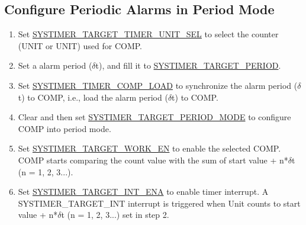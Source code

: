\documentclass[main\_\_EN.tex]{subfiles}
\begin{document}
\subsection{Configure Periodic Alarms in Period Mode}
\begin{enumerate}
    \item Set \hyperref[fielddesc:SYSTIMERTARGET0TIMERUNITSEL]{SYSTIMER\_TARGET\_TIMER\_UNIT\_SEL} to select the counter (UNIT or UNIT) used for COMP.
    \item Set a alarm period ($\delta$t), and fill it to \hyperref[fielddesc:SYSTIMERTARGET0PERIOD]{SYSTIMER\_TARGET\_PERIOD}.
    \item Set \hyperref[fielddesc:SYSTIMERTIMERCOMP0LOAD]{SYSTIMER\_TIMER\_COMP\_LOAD} to synchronize the alarm period ($\delta$t) to COMP, i.e., load the alarm period ($\delta$t) to COMP.
    \item Clear and then set \hyperref[fielddesc:SYSTIMERTARGET0PERIODMODE]{SYSTIMER\_TARGET\_PERIOD\_MODE} to configure COMP into period mode.
    \item Set \hyperref[fielddesc:SYSTIMERTARGET0WORKEN]{SYSTIMER\_TARGET\_WORK\_EN} to enable the selected COMP. COMP starts comparing the count value with the sum of start value + n*$\delta$t (n = 1, 2, 3...).
    \item Set \hyperref[fielddesc:SYSTIMERTARGET0INTENA]{SYSTIMER\_TARGET\_INT\_ENA} to enable timer interrupt. A SYSTIMER\_TARGET\_INT interrupt is triggered when Unit counts to start value + n*$\delta$t (n = 1, 2, 3...) set in step 2.
\end{enumerate}
\end{document}
